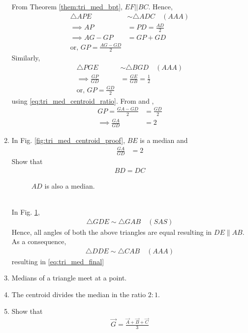 \begin{enumerate}[label=\arabic*.,ref=\thesubsection.\theenumi]
\solution  From Theorem \ref{them:tri_med_bpt}, $ EF || BC$.  Hence,
%
\begin{align}
\triangle APE &\sim \triangle ADC \quad (AAA)
\\
\implies AP &= PD = \frac{AD}{2}
\\
\implies  AG - GP &= GP + GD 
\\
\text{or, }  GP=\frac{AG - GD}{2} 
\label{eq:tri_med_centroid_ratio_AD1}
\end{align}
%
Similarly, 
%
\begin{align}
\triangle PGE &\sim \triangle BGD  \quad (AAA)
\\
\implies \frac{GP}{GD} &= \frac{GE}{GB} = \frac{1}{2}
\\
\text{or, }  GP=\frac{GD}{2} 
\label{eq:tri_med_centroid_ratio_AD2}
\end{align}
using \eqref{eq:tri_med_centroid_ratio}. From \label{eq:tri_med_centroid_ratio_AD1}
and \label{eq:tri_med_centroid_ratio_AD2},
%
\begin{align}
GP=\frac{GA - GD}{2} &=\frac{GD}{2}  
\\
\implies  \frac{GA}{GD} &=2
\end{align}
\item In Fig. 	\ref{fig:tri_med_centroid_proof}, $BE$ is a median and 
%
\begin{align}
\frac{GA}{GD} &=2
\end{align}
%
Show that
%
\begin{align}
\label{eq:tri_med_final}
BD = DC
\end{align}
%
\begin{figure}[!ht]
	\begin{center}
		\resizebox{\columnwidth}{!}{}
	\end{center}
	\caption{$AD$ is also a median. }
	\label{fig:tri_med_meet_proof}	
\end{figure}
%
\\
\solution 	In Fig. \ref{fig:tri_med_meet_proof},
%
\begin{align}
\triangle GDE \sim \triangle GAB \quad (SAS)
\end{align}
%
Hence, all angles of both the above triangles are equal resulting in $DE\parallel AB$. As a consequence, 
%
\begin{align}
\triangle DDE \sim \triangle CAB \quad (AAA)
\end{align}
%
resulting in \eqref{eq:tri_med_final}

\item Medians of a triangle meet at a point.
\label{them:tri_med_meet}
\item The centroid divides the median in the ratio $2:1$.
\label{them:tri_med_ratio}
%
\item Show that 
%
\begin{align}
\vec{G} = \frac{\vec{A}+\vec{B}+\vec{C}}{3}
\end{align}
\end{enumerate}
